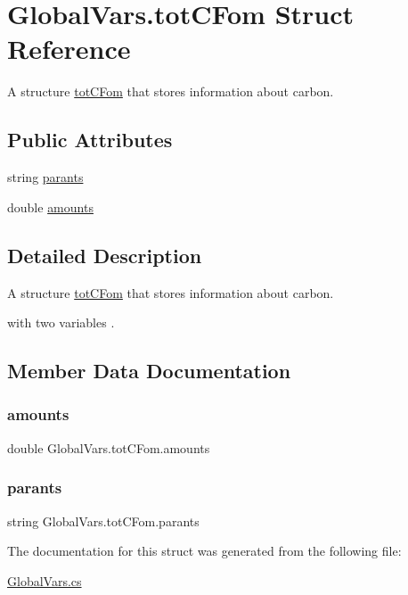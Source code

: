\hypertarget{struct_global_vars_1_1tot_c_fom}{}\section{Global\+Vars.\+tot\+C\+Fom Struct Reference}
\label{struct_global_vars_1_1tot_c_fom}


A structure \mbox{\hyperlink{struct_global_vars_1_1tot_c_fom}{tot\+C\+Fom}} that stores information about carbon.  


\subsection*{Public Attributes}
\begin{DoxyCompactItemize}
\item 
string \mbox{\hyperlink{struct_global_vars_1_1tot_c_fom_a54ecf640fa80c336e59aba044c496551}{parants}}
\item 
double \mbox{\hyperlink{struct_global_vars_1_1tot_c_fom_a193b141d45c969537058a8b5ecbfe45c}{amounts}}
\end{DoxyCompactItemize}


\subsection{Detailed Description}
A structure \mbox{\hyperlink{struct_global_vars_1_1tot_c_fom}{tot\+C\+Fom}} that stores information about carbon. 

with two variables . 

\subsection{Member Data Documentation}
\mbox{\label{struct_global_vars_1_1tot_c_fom_a193b141d45c969537058a8b5ecbfe45c}} 
\subsubsection{\texorpdfstring{amounts}{amounts}}
{\footnotesize\ttfamily double Global\+Vars.\+tot\+C\+Fom.\+amounts}

\mbox{\label{struct_global_vars_1_1tot_c_fom_a54ecf640fa80c336e59aba044c496551}} 
\subsubsection{\texorpdfstring{parants}{parants}}
{\footnotesize\ttfamily string Global\+Vars.\+tot\+C\+Fom.\+parants}



The documentation for this struct was generated from the following file\+:\begin{DoxyCompactItemize}
\item 
\mbox{\hyperlink{_global_vars_8cs}{Global\+Vars.\+cs}}\end{DoxyCompactItemize}
